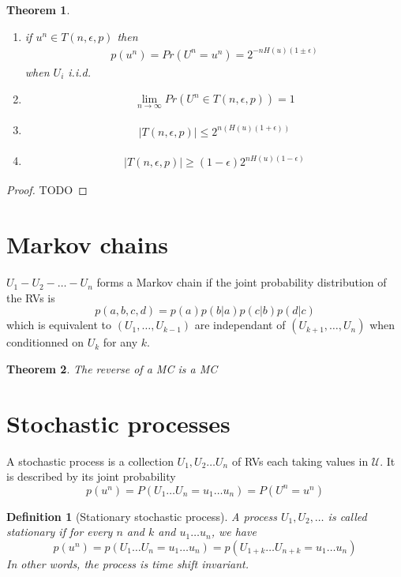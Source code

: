 \documentclass{article}
\newtheorem{theorem}{Theorem}[section]
\newtheorem{definition}{Definition}[section]
\def\U{\mathcal{U}}
\begin{document}
\begin{theorem}
  \begin{enumerate}
    \item if $u^n \in T(n, \epsilon, p)$ then
    \begin{align*}
      p(u^n) = Pr(U^n = u^n) = 2^{-n H(u)(1 \pm \epsilon)}
    \end{align*}  
    when $U_i$ i.i.d.
    \item 
    \begin{align*}
      \lim_{n \rightarrow \infty} Pr(U^n \in T(n, \epsilon, p)) = 1
    \end{align*}
    \item 
    \begin{align*}
      |T(n, \epsilon, p)| \leq 2^{n (H(u)(1 + \epsilon))}
    \end{align*}
    \item 
    \begin{align*}
      |T(n, \epsilon, p)| \geq (1-\epsilon) 2^{n H(u)(1-\epsilon)}
    \end{align*}
  \end{enumerate}
\end{theorem}

\begin{proof}
  TODO
\end{proof}



\newpage
\begin{appendices}
\section{Markov chains}
\label{appendix:markov-chains}

$U_1 - U_2 - \dots - U_n$ forms a Markov chain if the joint probability
distribution of the RVs is
\[
  p(a,b,c,d) = p(a)p(b|a)p(c|b)p(d|c)
\]
which is equivalent to $(U_1, \dots, U_{k-1})$ are independant of $(U_{k+1}, \dots, U_n)$ when conditionned on $U_k$ for any $k$.


\begin{theorem}
  The reverse of a MC is a MC
\end{theorem}


\section{Stochastic processes}
\label{appendix:stoch-proc}

A stochastic process is a collection $U_1, U_2 \dots U_n$ of RVs each taking values in $\U$. It is described by its joint probability
\[
  p(u^n) = P(U_1 \dots U_n = u_1 \dots u_n) = P(U^n = u^n)
\]

\begin{definition}[Stationary stochastic process]
  A process $U_1, U_2, \dots$ is called stationary if for every $n$ and $k$ and $u_1 \dots u_n$, we have
  \[
    p(u^n) = p(U_1 \dots U_n = u_1 \dots u_n) = p(U_{1+k} \dots U_{n+k} = u_1 \dots u_n)
  \]
  In other words, the process is time shift invariant.
\end{definition}

\end{appendices}
\end{document}
